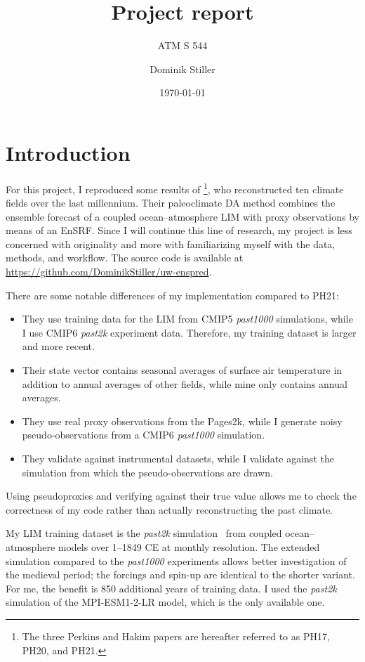 \documentclass[parskip=half,DIV=16]{scrartcl}
\title{Project report}
\subtitle{ATM S 544}
\author{Dominik Stiller}
\date{\today}
\begin{document}
\maketitle


\section{Introduction}

For this project, I reproduced some results of \textcite{Perkins2017,Perkins2020,Perkins2021}\footnote{The three Perkins and Hakim papers are hereafter referred to as PH17, PH20, and PH21.}, who reconstructed ten climate fields over the last millennium. Their paleoclimate \gls{DA} method combines the ensemble forecast of a coupled ocean--atmosphere \gls{LIM} with proxy observations by means of an \gls{EnSRF}. Since I will continue this line of research, my project is less concerned with originality and more with familiarizing myself with the data, methods, and workflow. The source code is available at \url{https://github.com/DominikStiller/uw-enspred}.

There are some notable differences of my implementation compared to PH21:
\begin{itemize}
    \item They use training data for the \gls{LIM} from CMIP5 \emph{past1000} simulations, while I use CMIP6 \emph{past2k} experiment data. Therefore, my training dataset is larger and more recent.
    \item Their state vector contains seasonal averages of surface air temperature in addition to annual averages of other fields, while mine only contains annual averages.
    \item They use real proxy observations from the Pages2k, while I generate noisy pseudo-observations from a CMIP6 \emph{past1000} simulation.
    \item They validate against instrumental datasets, while I validate against the simulation from which the pseudo-observations are drawn.
\end{itemize}
Using pseudoproxies and verifying against their true value allows me to check the correctness of my code rather than actually reconstructing the past climate.

My \gls{LIM} training dataset is the \emph{past2k} simulation~\parencite{Jungclaus2017} from coupled ocean--atmosphere models over 1--1849 CE at monthly resolution. The extended simulation compared to the \emph{past1000} experiments allows better investigation of the medieval period; the forcings and spin-up are identical to the shorter variant. For me, the benefit is 850 additional years of training data. I used the \emph{past2k} simulation of the MPI-ESM1-2-LR model, which is the only available one.
\end{document}
